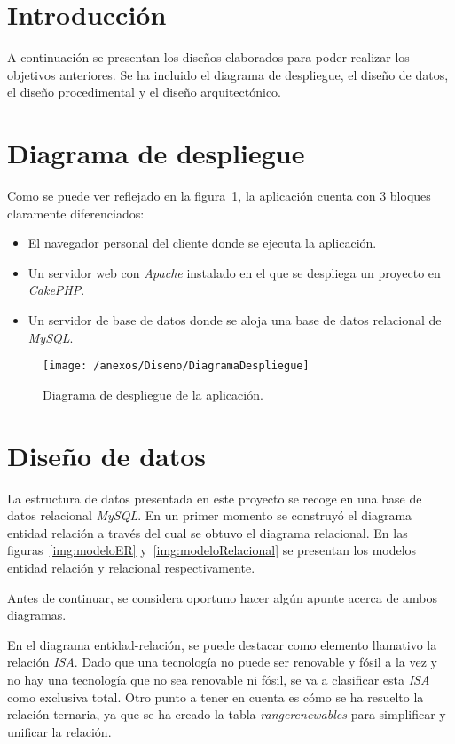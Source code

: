 
\section{Introducción}

A continuación se presentan los diseños elaborados para poder realizar los objetivos anteriores. Se ha incluido el diagrama de despliegue, el diseño de datos, el diseño procedimental y el diseño arquitectónico.

\section{Diagrama de despliegue}

Como se puede ver reflejado en la figura~\ref{img:diagramaDespliegue}, la aplicación cuenta con 3 bloques claramente diferenciados:

\begin{itemize}
	\item El navegador personal del cliente donde se ejecuta la aplicación. 
	\item Un servidor web con \textit{Apache} instalado en el que se despliega un proyecto en \textit{CakePHP}.
	\item Un servidor de base de datos donde se aloja una base de datos relacional de \textit{MySQL}.
\end{itemize}

\begin{figure}[h]
	\centering
	\texttt{[image: /anexos/Diseno/DiagramaDespliegue]}
	\caption{Diagrama de despliegue de la aplicación.}
	\label{img:diagramaDespliegue}
\end{figure}

\section{Diseño de datos}

La estructura de datos presentada en este proyecto se recoge en una base de datos relacional \textit{MySQL}. En un primer momento se construyó el diagrama entidad relación a través del cual se obtuvo el diagrama relacional. En las figuras~\ref{img:modeloER} y~\ref{img:modeloRelacional} se presentan los modelos entidad relación y relacional respectivamente.

Antes de continuar, se considera oportuno hacer algún apunte acerca de ambos diagramas.

En el diagrama entidad-relación, se puede destacar como elemento llamativo la relación \textit{ISA}. Dado que una tecnología no puede ser renovable y fósil a la vez y no hay una tecnología que no sea renovable ni fósil, se va a clasificar esta \textit{ISA} como exclusiva total. 
Otro punto a tener en cuenta es cómo se ha resuelto la relación ternaria, ya que se ha creado la tabla \textit{rangerenewables} para simplificar y unificar la relación.

